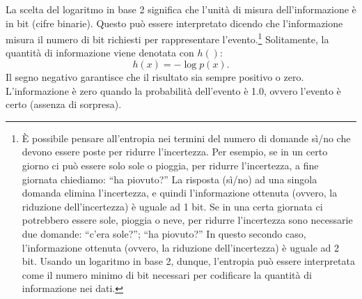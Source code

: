\documentclass[
  10pt,
  italian,
  a4paper,
  extrafontsizes,onecolumn,openright
  ]{memoir}
\theoremstyle{definition}
\theoremstyle{definition}
\theoremstyle{definition}
\theoremstyle{definition}
\theoremstyle{remark}
\begin{document}
La scelta del logaritmo in base 2 significa che l'unità di misura dell'informazione è in bit (cifre binarie). Questo può essere interpretato dicendo che l'informazione misura il numero di bit richiesti per rappresentare l'evento.\footnote{È possibile pensare all'entropia nei termini del numero di domande sì/no che devono essere poste per ridurre l'incertezza. Per esempio, se in un certo giorno ci può essere solo sole o pioggia, per ridurre l'incertezza, a fine giornata chiediamo: ``ha piovuto?'' La risposta (sì/no) ad una singola domanda elimina l'incertezza, e quindi l'informazione ottenuta (ovvero, la riduzione dell'incertezza) è uguale ad 1 bit. Se in una certa giornata ci potrebbero essere sole, pioggia o neve, per ridurre l'incertezza sono necessarie due domande: ``c'era sole?''; ``ha piovuto?'' In questo secondo caso, l'informazione ottenuta (ovvero, la riduzione dell'incertezza) è uguale ad 2 bit. Usando un logaritmo in base 2, dunque, l'entropia può essere interpretata come il numero minimo di bit necessari per codificare la quantità di informazione nei dati.} Solitamente, la quantità di informazione viene denotata con \(h()\):
\[
h(x) = -\log p(x).
\]
Il segno negativo garantisce che il risultato sia sempre positivo o zero. L'informazione è zero quando la probabilità dell'evento è 1.0, ovvero l'evento è certo (assenza di sorpresa).
\end{document}
